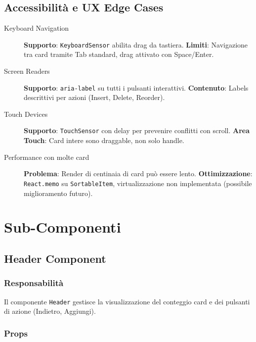 \documentclass[11pt,a4paper]{article}
\begin{document}
\subsection{Accessibilità e UX Edge Cases}

\begin{description}
    \item[Keyboard Navigation] \textbf{Supporto}: \texttt{KeyboardSensor} abilita drag da tastiera. \textbf{Limiti}: Navigazione tra card tramite Tab standard, drag attivato con Space/Enter.
    
    \item[Screen Readers] \textbf{Supporto}: \texttt{aria-label} su tutti i pulsanti interattivi. \textbf{Contenuto}: Labels descrittivi per azioni (Insert, Delete, Reorder).
    
    \item[Touch Devices] \textbf{Supporto}: \texttt{TouchSensor} con delay per prevenire conflitti con scroll. \textbf{Area Touch}: Card intere sono draggable, non solo handle.
    
    \item[Performance con molte card] \textbf{Problema}: Render di centinaia di card può essere lento. \textbf{Ottimizzazione}: \texttt{React.memo} su \texttt{SortableItem}, virtualizzazione non implementata (possibile miglioramento futuro).
\end{description}


\section{Sub-Componenti}

\subsection{Header Component}

\subsubsection{Responsabilità}

Il componente \texttt{Header} gestisce la visualizzazione del conteggio card e dei pulsanti di azione (Indietro, Aggiungi).

\subsubsection{Props}
\end{document}
